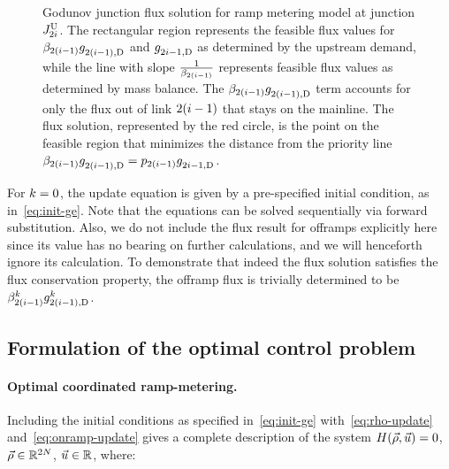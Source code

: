 \begin{figure}
								\caption{Godunov junction flux solution for ramp metering model at junction
									$J_{2i}^{\text{U}}$. The rectangular region represents the feasible flux
									values for $\splitratio_{2\left(\link-1\right)}\fout{2\left(\link-1\right)}{}$
									and $g_{2i-1,\text{D}}^{}$ as determined by the upstream demand, while
									the line with slope\label{fig:Godunov-junction-flux} $\frac{1}{\splitratio_{2\left(\link-1\right)}}$
									represents feasible flux values as determined by mass balance. The
									$\splitratio_{2\left(\link-1\right)}\fout{2\left(\link-1\right)}{}$
									term accounts for only the flux out of link $2\left(\link-1\right)$
									that stays on the mainline. The flux solution, represented by the
									red circle, is the point on the feasible region that minimizes the
									distance from the priority line $\splitratio_{2\left(\link-1\right)}\fout{2\left(\link-1\right)}{}=p_{2(\link-1)}\fout{2\link-1}{}$.}
							\end{figure}
							
							
							For $k=0$, the update equation is given by a pre-specified initial
							condition, as in~\eqref{eq:init-ge}. Note that the equations can
							be solved sequentially via forward substitution. Also, we do not include
							the flux result for offramps explicitly here since its value has no
							bearing on further calculations, and we will henceforth ignore its
							calculation. To demonstrate that indeed the flux solution satisfies
							the flux conservation property, the offramp flux is trivially determined
							to be $\splitratio_{2\left(\link-1\right)}^{\tind}\fout{2\left(\link-1\right)}{\tind}$.
							
							
							\subsection{Formulation of the optimal control problem}
							
							
							\paragraph{Optimal coordinated ramp-metering.}
							
							Including the initial conditions as specified in~\eqref{eq:init-ge}
							with~\eqref{eq:rho-update} and~\eqref{eq:onramp-update} gives
							a complete description of the system $\sys\left(\state,\control\right)=0$,
							$\vec{\rho}\in\mathbb{R}^{2N}$, $\vec{u}\in\mathbb{R}$, where:
							
